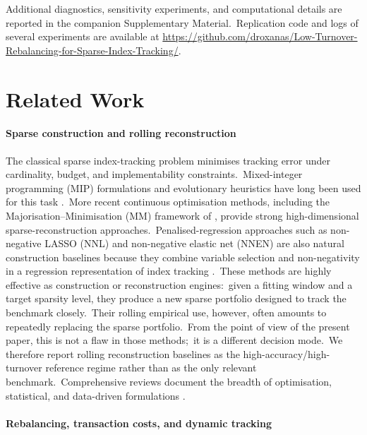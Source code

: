 \documentclass[11pt]{article}
\begin{document}
Additional diagnostics, sensitivity experiments, and computational details are reported in the companion Supplementary Material.\ Replication code and logs of several experiments are available at
\href{https://github.com/droxanas/Low-Turnover-Rebalancing-for-Sparse-Index-Tracking/}{https://github.com/droxanas/Low-Turnover-Rebalancing-for-Sparse-Index-Tracking/}.

\section{Related Work}

\paragraph{Sparse construction and rolling reconstruction}

The classical sparse index-tracking problem minimises tracking error under cardinality, budget, and implementability constraints.\ Mixed-integer programming (MIP) formulations and evolutionary heuristics have long been used for this task \cite{Beasley2003, CanakgozBeasley2009}.\ More recent continuous optimisation methods, including the Majorisation--Minimisation (MM) framework of \citet{Benidis2018a,Benidis2018b}, provide strong high-dimensional sparse-reconstruction approaches.\ Penalised-regression approaches such as non-negative LASSO (NNL) and non-negative elastic net (NNEN) are also natural construction baselines because they combine variable selection and non-negativity in a regression representation of index tracking \cite{wu2014nonnegativelasso,wu2014nonnegativeEN}.\ These methods are highly effective as construction or reconstruction engines:\ given a fitting window and a target sparsity level, they produce a new sparse portfolio designed to track the benchmark closely.\ Their rolling empirical use, however, often amounts to repeatedly replacing the sparse portfolio.\ From the point of view of the present paper, this is not a flaw in those methods;\ it is a different decision mode.\ We therefore report rolling reconstruction baselines as the high-accuracy/high-turnover reference regime rather than as the only relevant benchmark.\ Comprehensive reviews document the breadth of optimisation, statistical, and data-driven formulations \cite{Silva2024,dhingra2026index}.\


\paragraph{Rebalancing, transaction costs, and dynamic tracking}
\end{document}
